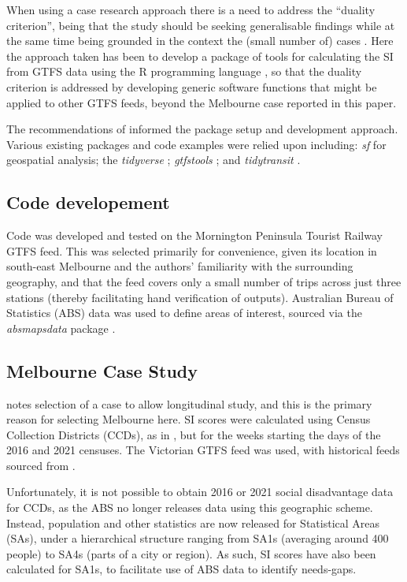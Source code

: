 \documentclass[preprint, 3p,
authoryear]{elsarticle} %
\begin{document}
When using a case research approach there is a need to address the
``duality criterion'', being that the study should be seeking
generalisable findings while at the same time being grounded in the
context the (small number of) cases
\citep{Denscombe2007aa, Ketokivi2014aa}. Here the approach taken has
been to develop a package of tools for calculating the SI from GTFS data
using the R programming language \citep{R-base}, so that the duality
criterion is addressed by developing generic software functions that
might be applied to other GTFS feeds, beyond the Melbourne case reported
in this paper.

The recommendations of \citet{wickham2023r} informed the package setup
and development approach. Various existing packages and code examples
were relied upon including: \emph{sf} \citep{R-sf} for geospatial
analysis; the \emph{tidyverse} \citep{tidyverse2019}; \emph{gtfstools}
\citep{R-gtfstools}; and \emph{tidytransit} \citep{R-tidytransit}.

\subsection{Code developement}\label{code-developement}

Code was developed and tested on the Mornington Peninsula Tourist
Railway GTFS feed. This was selected primarily for convenience, given
its location in south-east Melbourne and the authors' familiarity with
the surrounding geography, and that the feed covers only a small number
of trips across just three stations (thereby facilitating hand
verification of outputs). Australian Bureau of Statistics (ABS) data was
used to define areas of interest, sourced via the \emph{absmapsdata}
package \citep{R-absmapsdata}.

\subsection{Melbourne Case Study}\label{melbourne-case-study}

\citet{Yin2009aa} notes selection of a case to allow longitudinal study,
and this is the primary reason for selecting Melbourne here. SI scores
were calculated using Census Collection Districts (CCDs), as in
\citet{currie2010identifying}, but for the weeks starting the days of
the 2016 and 2021 censuses. The Victorian GTFS feed was used, with
historical feeds sourced from \citet{transitfeeds_victoria:2023aa}.

Unfortunately, it is not possible to obtain 2016 or 2021 social
disadvantage data for CCDs, as the ABS no longer releases data using
this geographic scheme. Instead, population and other statistics are now
released for Statistical Areas (SAs), under a hierarchical structure
ranging from SA1s (averaging around 400 people) to SA4s (parts of a city
or region)\citep{ABSmaps}. As such, SI scores have also been calculated
for SA1s, to facilitate use of ABS data to identify needs-gaps.
\end{document}
